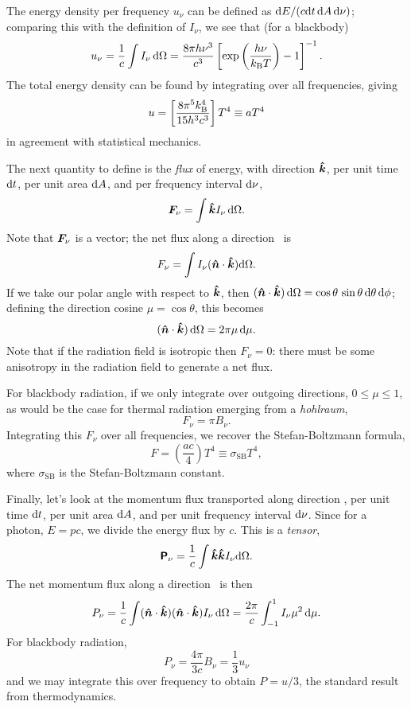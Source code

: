 The energy density per frequency $u_{\nu}$ can be defined as $\mathrm{d} E/(c \mathrm{d} t\,\mathrm{d} A\,\mathrm{d}\nu)$; comparing this with the definition of $I_{\nu}$, we see that (for a blackbody)
\begin{equation}\label{e.radiation-energy-density}
u_{\nu} = \frac{1}{c}\int I_{\nu}\,\mathrm{d}\Omega = \frac{8\pi h\nu^{3}}{c^{3}}\left[\exp\left(\frac{h\nu}{k_\mathrm{B} T}\right)-1\right]^{-1}.
\end{equation}
The total energy density can be found by integrating over all frequencies, giving
\[ u = \left[\frac{8\pi^{5}k_\mathrm{B}^{4}}{15 h^{3}c^{3}}\right] T^{4}\equiv aT^{4} \]
in agreement with statistical mechanics.

The next quantity to define is the \emph{flux} of energy, with direction $\boldsymbol{\hat{k}}$, per unit time $\mathrm{d} t$,  per unit area $\mathrm{d} A$, and per frequency interval $\mathrm{d}\nu$,
\begin{equation}\label{e.radiation-flux}
\boldsymbol{F}_{\nu} = \int \boldsymbol{\hat{k}} I_{\nu} \,\mathrm{d}\Omega.
\end{equation}
Note that $\boldsymbol{F}_{\nu}$ is a vector;  the net flux along a direction \unitn\ is
\[ F_{\nu} = \int I_{\nu}(\boldsymbol{\hat{n}}\cdot\boldsymbol{\hat{k}})\mathrm{d}\Omega. \]
If we take our polar angle with respect to $\boldsymbol{\hat{k}}$, then $(\boldsymbol{\hat{n}}\cdot\boldsymbol{\hat{k}})\,\mathrm{d}\Omega = \cos\theta\,\sin\theta\,\mathrm{d}\theta\,\mathrm{d} \phi$; defining the direction cosine $\mu = \cos\theta$, this becomes 
\[ (\boldsymbol{\hat{n}}\cdot\boldsymbol{\hat{k}})\,\mathrm{d}\Omega = 2\pi \mu\,\mathrm{d}\mu. \]
Note that if the radiation field is isotropic then $F_{\nu}=0$: there must be some anisotropy in the radiation field to generate a net flux.

For blackbody radiation, if we only integrate over outgoing directions, $0\le \mu\le 1$, as would be the case for thermal radiation emerging from a \emph{hohlraum},
\[ F_{\nu} = \pi B_{\nu}.\]
Integrating this $F_{\nu}$ over all frequencies, we recover the Stefan-Boltzmann formula,
\[ F = \left(\frac{ac}{4}\right) T^{4} \equiv \sigma_{\mathrm{SB}} T^{4}, \]
where $\sigma_{\mathrm{SB}}$ is the Stefan-Boltzmann constant.

Finally, let's look at the momentum flux transported along direction \unitk, per unit time $\mathrm{d} t$, per unit area $\mathrm{d} A$, and per unit frequency interval $\mathrm{d}\nu$.  Since for a photon, $E = pc$, we divide the energy flux by $c$.
This is a \emph{tensor},
\begin{equation}\label{e.radiation-pressure-tensor}
\boldsymbol{\mathsf{P}}_{\nu} = \frac{1}{c}\int \boldsymbol{\hat{k}}\boldsymbol{\hat{k}} I_{\nu}\mathrm{d}\Omega.
\end{equation}
The net momentum flux along a direction \unitn\ is then
\[ P_{\nu} = \frac{1}{c}\int (\boldsymbol{\hat{n}}\cdot\boldsymbol{\hat{k}})(\boldsymbol{\hat{n}}\cdot\boldsymbol{\hat{k}}) I_{\nu}\,\mathrm{d} \Omega = \frac{2\pi}{c}\int_{-1}^{1} I_{\nu}\mu^{2}\,\mathrm{d}\mu. \]
For blackbody radiation, 
\[ P_{\nu} = \frac{4\pi}{3c} B_{\nu}  = \frac{1}{3}u_{\nu}\]
and we may integrate this over frequency to obtain $P = u/3$, the standard result from thermodynamics.

